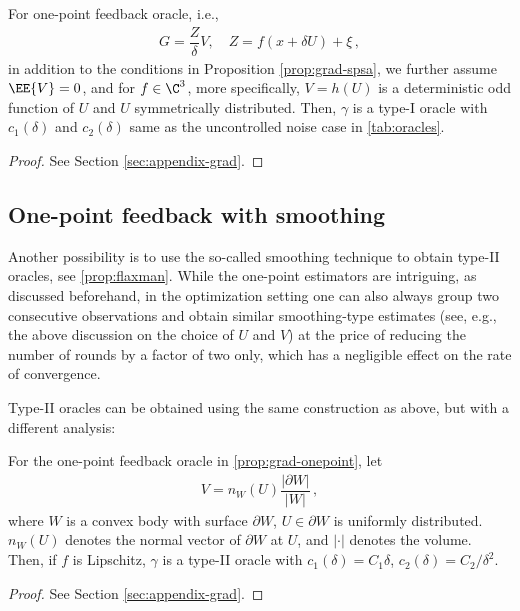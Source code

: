\begin{proposition}
\label{prop:grad-onepoint}
For one-point feedback oracle, i.e.,
\begin{align*}
G = \dfrac{Z}{\delta}V, \quad Z=f(x+\delta U)+\xi\,,
\end{align*}
in addition to the conditions in Proposition \ref{prop:grad-spsa}, we further assume $\EE{V}=0$,
and for $f \in \C^3$, more specifically, $V=h(U)$ is a deterministic odd function of $U$ and $U$ symmetrically distributed. Then, $\gamma$ is a type-I oracle with $c_1(\delta)$ and $c_2(\delta)$ same as the uncontrolled noise case in \cref{tab:oracles}.
\end{proposition}
\begin{proof}
See Section \ref{sec:appendix-grad}.
\end{proof}

\subsection{One-point feedback with smoothing}
Another possibility is to use the so-called smoothing technique 
\citep{PoTsy90,flaxman2005online,HaLe14:SOC}  
to obtain type-II oracles, see \cref{prop:flaxman}.
While the one-point estimators are intriguing, as discussed beforehand, 
in the optimization setting one can also always group two consecutive observations and obtain similar smoothing-type estimates (see, e.g., the above discussion on the choice of $U$ and $V$) 
at the price of reducing the number of rounds by a factor of two only, which has a negligible effect on the rate of convergence.

Type-II oracles can be obtained using the same construction as above, but with a different analysis:
\begin{proposition}
\label{prop:flaxman}
For the one-point feedback oracle in \cref{prop:grad-onepoint}, let
\begin{align*}
V = n_W(U)\dfrac{\lvert \partial W\rvert}{\lvert W \rvert}\,,
\end{align*}
where $W$ is a convex body with surface $\partial W$, $U \in \partial W$ is uniformly distributed. $n_W(U)$ denotes the normal vector of $\partial W$ at $U$, and $\lvert \cdot \rvert$ denotes the volume. Then, if $f$ is Lipschitz, $\gamma$ is a type-II oracle with $c_1(\delta)=C_1 \delta$, $c_2(\delta) = C_2/\delta^2$.
\end{proposition}
\begin{proof}
See Section \ref{sec:appendix-grad}.
\end{proof}


